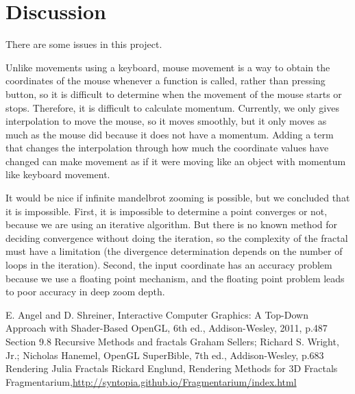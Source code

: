 \documentclass[a4paper]{article}
\begin{document}
\section{Discussion}
There are some issues in this project.
\begin{description}[style=nextline]
\item[Smooth Camera Movement]
Unlike movements using a keyboard, mouse movement is a way to obtain the coordinates of the mouse whenever a function is called, rather than pressing button, so it is difficult to determine when the movement of the mouse starts or stops.
Therefore, it is difficult to calculate momentum.
Currently, we only gives interpolation to move the mouse, so it moves smoothly, but it only moves as much as the mouse did because it does not have a momentum.
Adding a term that changes the interpolation through how much the coordinate values have changed can make movement as if it were moving like an object with momentum like keyboard movement.
\item[Infinite Mandelbrot zoom]
It would be nice if infinite mandelbrot zooming is possible, but we concluded that it is impossible. 
First, it is impossible to determine a point converges or not, because we are using an iterative algorithm. 
But there is no known method for deciding convergence without doing the iteration, so the complexity of the fractal must have a limitation (the divergence determination depends on the number of loops in the iteration). 
Second, the input coordinate has an accuracy problem because we use a floating point mechanism, and the floating point problem leads to poor accuracy in deep zoom depth. 
\end{description}

\begin{thebibliography}{1}
E. Angel and D. Shreiner, Interactive Computer Graphics: A Top-Down Approach with Shader-Based OpenGL, 6th ed., Addison-Wesley, 2011, p.487 Section 9.8 Recursive Methods and fractals
Graham Sellers; Richard S. Wright, Jr.; Nicholas Hanemel, OpenGL SuperBible, 7th ed., Addison-Wesley, p.683 Rendering Julia Fractals
Rickard Englund, Rendering Methods for 3D Fractals
Fragmentarium,\url{http://syntopia.github.io/Fragmentarium/index.html}
\end{thebibliography}
\end{document}

